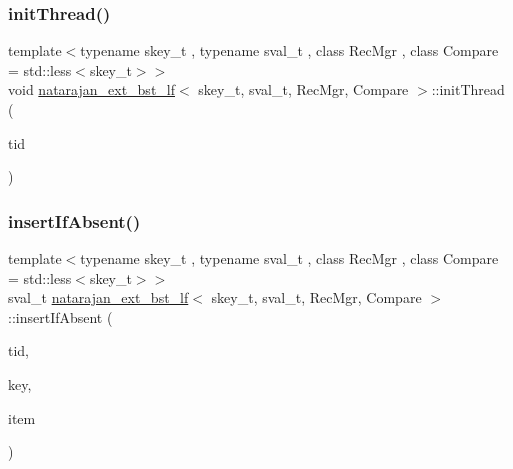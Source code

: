 \mbox{\label{classnatarajan__ext__bst__lf_a6e3a0c6117221f806dde9c903c90c9b6}} 
\subsubsection{\texorpdfstring{init\+Thread()}{initThread()}\hspace{0.1cm}{\footnotesize\ttfamily [2/2]}}
{\footnotesize\ttfamily template$<$typename skey\+\_\+t , typename sval\+\_\+t , class Rec\+Mgr , class Compare  = std\+::less$<$skey\+\_\+t$>$$>$ \\
void \hyperlink{classnatarajan__ext__bst__lf}{natarajan\+\_\+ext\+\_\+bst\+\_\+lf}$<$ skey\+\_\+t, sval\+\_\+t, Rec\+Mgr, Compare $>$\+::init\+Thread (\begin{DoxyParamCaption}\item[{const int}]{tid }\end{DoxyParamCaption})\hspace{0.3cm}{\ttfamily [inline]}}

\mbox{\label{classnatarajan__ext__bst__lf_acee96bf831b747c5c9c2541c5101f506}} 
\subsubsection{\texorpdfstring{insert\+If\+Absent()}{insertIfAbsent()}\hspace{0.1cm}{\footnotesize\ttfamily [1/2]}}
{\footnotesize\ttfamily template$<$typename skey\+\_\+t , typename sval\+\_\+t , class Rec\+Mgr , class Compare  = std\+::less$<$skey\+\_\+t$>$$>$ \\
sval\+\_\+t \hyperlink{classnatarajan__ext__bst__lf}{natarajan\+\_\+ext\+\_\+bst\+\_\+lf}$<$ skey\+\_\+t, sval\+\_\+t, Rec\+Mgr, Compare $>$\+::insert\+If\+Absent (\begin{DoxyParamCaption}\item[{const int}]{tid,  }\item[{skey\+\_\+t}]{key,  }\item[{sval\+\_\+t}]{item }\end{DoxyParamCaption})\hspace{0.3cm}{\ttfamily [inline]}}

